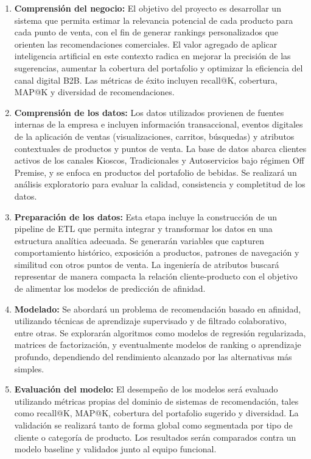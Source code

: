 \documentclass[
11pt, %
]{charter}
\begin{document}
\begin{enumerate}
\item \textbf{Comprensión del negocio:}
El objetivo del proyecto es desarrollar un sistema que permita estimar la relevancia potencial de cada producto para cada punto de venta, con el fin de generar rankings personalizados que orienten las recomendaciones comerciales. El valor agregado de aplicar inteligencia artificial en este contexto radica en mejorar la precisión de las sugerencias, aumentar la cobertura del portafolio y optimizar la eficiencia del canal digital B2B. Las métricas de éxito incluyen recall@K, cobertura, MAP@K y diversidad de recomendaciones.

\item \textbf{Comprensión de los datos:}
Los datos utilizados provienen de fuentes internas de la empresa e incluyen información transaccional, eventos digitales de la aplicación de ventas (visualizaciones, carritos, búsquedas) y atributos contextuales de productos y puntos de venta. La base de datos abarca clientes activos de los canales Kioscos, Tradicionales y Autoservicios bajo régimen Off Premise, y se enfoca en productos del portafolio de bebidas. Se realizará un análisis exploratorio para evaluar la calidad, consistencia y completitud de los datos.

\item \textbf{Preparación de los datos:}
Esta etapa incluye la construcción de un pipeline de ETL que permita integrar y transformar los datos en una estructura analítica adecuada. Se generarán variables que capturen comportamiento histórico, exposición a productos, patrones de navegación y similitud con otros puntos de venta. La ingeniería de atributos buscará representar de manera compacta la relación cliente-producto con el objetivo de alimentar los modelos de predicción de afinidad.

\item \textbf{Modelado:}
Se abordará un problema de recomendación basado en afinidad, utilizando técnicas de aprendizaje supervisado y de filtrado colaborativo, entre otras. Se explorarán algoritmos como modelos de regresión regularizada, matrices de factorización, y eventualmente modelos de ranking o aprendizaje profundo, dependiendo del rendimiento alcanzado por las alternativas más simples.

\item \textbf{Evaluación del modelo:}
El desempeño de los modelos será evaluado utilizando métricas propias del dominio de sistemas de recomendación, tales como recall@K, MAP@K, cobertura del portafolio sugerido y diversidad. La validación se realizará tanto de forma global como segmentada por tipo de cliente o categoría de producto. Los resultados serán comparados contra un modelo baseline y validados junto al equipo funcional.


\end{enumerate}
\end{document}
